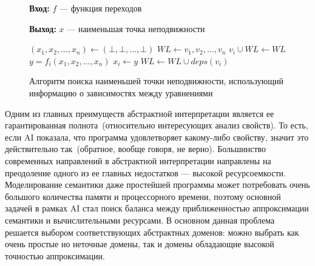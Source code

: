 \begin{figure}[h!]
\textbf{Вход:} $f$ --- функция переходов

\textbf{Выход:} $x$ --- наименьшая точка неподвижности

\begin{algorithmic}
\State $(x_1, x_2, \ldots, x_n) \gets (\bot, \bot, \ldots, \bot)$ 
\State $WL \gets {v_1, v_2, \ldots, v_n}$ 
	\State ${v_i} \cup WL \gets WL$
	\State $y = f_i(x_1, x_2, \ldots, x_n)$ 
		\State $x_i \gets y$
		\State $WL \gets WL \cup deps(v_i)$
	\EndIf 
\EndWhile
\end{algorithmic}

\caption{Алгоритм поиска наименьшей точки неподвижности, использующий 
информацию о зависимостях между уравнениями}
\label{image:worklistLFP}
\end{figure}

Одним из главных преимуществ абстрактной интерпретации является ее 
гарантированная полнота~(относительно интересующих анализ свойств). То есть,
если AI показала, что программа удовлетворяет какому-либо свойству, значит это
действительно так~(обратное, вообще говоря, не верно). Большинство современных
направлений в абстрактной интерпретации направлены на преодоление одного из ее
главных недостатков --- высокой ресурсоемкости. Моделирование семантики даже 
простейшей программы может потребовать очень большого количества памяти и 
процессорного времени, поэтому основной задачей в рамках AI стал поиск баланса 
между приближенностью аппроксимации семантики и вычислительными ресурсами.
В основном данная проблема решается выбором соответствующих абстрактных доменов:
можно выбрать как очень простые но неточные домены, так и домены обладающие 
высокой точностью аппроксимации.

